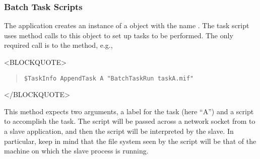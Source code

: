 \subsubsection{Batch Task Scripts}\label{sec:batchschedtask}\par
The application 
creates an instance of a  object with
the name .  The task script uses
method calls to this object to set up tasks to be performed.  The only
required call is to the  method, e.g.,
\begin{rawhtml}
<BLOCKQUOTE>
\end{rawhtml}
\begin{quote}
\begin{verbatim}
$TaskInfo AppendTask A "BatchTaskRun taskA.mif"
\end{verbatim}
\end{quote}
\begin{rawhtml}
</BLOCKQUOTE>
\end{rawhtml}
This method expects two arguments, a label for the task (here ``A'') and
a script to accomplish the task.
The script will be passed across a
network socket from
 to a slave application, and
then the script will be interpreted by the slave.  In particular, keep
in mind that the file system seen by the script will be that of the
machine on which the slave process is running.

